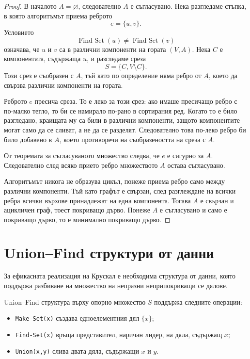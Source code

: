 \begin{proof}
В началото $A=\varnothing$, следователно $A$ е съгласувано. Нека разгледаме стъпка, в която алгоритъмът приема реброто
\[
e=\{u,v\}.
\]
Условието
\[
\operatorname{Find\mbox{-}Set}(u)\neq\operatorname{Find\mbox{-}Set}(v)
\]
означава, че $u$ и $v$ са в различни компоненти на гората $(V,A)$. Нека $C$ е компонентата, съдържаща $u$, и разгледаме среза
\[
S=\{C,V\setminus C\}.
\]
Този срез е съобразен с $A$, тъй като по определение няма ребро от $A$, което да свързва различни компоненти на гората.

Реброто $e$ пресича среза. То е леко за този срез: ако имаше пресичащо ребро с по-малко тегло, то би се намирало по-рано в сортирания ред. Когато то е било разгледано, краищата му са били в различни компоненти, защото компонентите могат само да се сливат, а не да се разделят. Следователно това по-леко ребро би било добавено в $A$, което противоречи на съобразеността на среза с $A$.

От теоремата за съгласуваното множество следва, че $e$ е сигурно за $A$. Следователно след всяко прието ребро множеството $A$ остава съгласувано.

Алгоритъмът никога не образува цикъл, понеже приема ребро само между различни компоненти. Тъй като графът е свързан, след разглеждане на всички ребра всички върхове принадлежат на една компонента. Тогава $A$ е свързан и ацикличен граф, тоест покриващо дърво. Понеже $A$ е съгласувано и само е покриващо дърво, то е минимално покриващо дърво.
\end{proof}

\section{Union--Find структури от данни}\label{s:7.5}

За ефикасната реализация на Крускал е необходима структура от данни, която поддържа разбиване на множество на непразни неприпокриващи се дялове.

\begin{defn}
Union--Find структура върху опорно множество $S$ поддържа следните операции:

\begin{itemize}
\item \verb|Make-Set(x)| създава едноелементния дял $\{x\}$;
\item \verb|Find-Set(x)| връща представител, наричан лидер, на дяла, съдържащ $x$;
\item \verb|Union(x,y)| слива двата дяла, съдържащи $x$ и $y$.
\end{itemize}
\end{defn}

